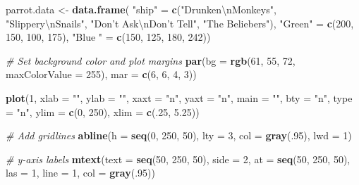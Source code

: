 \documentclass[]{book}
\newenvironment{Shaded}{\begin{snugshade}}{\end{snugshade}}
\newcommand{\KeywordTok}[1]{\textcolor[rgb]{0.13,0.29,0.53}{\textbf{#1}}}
\newcommand{\DataTypeTok}[1]{\textcolor[rgb]{0.13,0.29,0.53}{#1}}
\newcommand{\DecValTok}[1]{\textcolor[rgb]{0.00,0.00,0.81}{#1}}
\newcommand{\FloatTok}[1]{\textcolor[rgb]{0.00,0.00,0.81}{#1}}
\newcommand{\CharTok}[1]{\textcolor[rgb]{0.31,0.60,0.02}{#1}}
\newcommand{\StringTok}[1]{\textcolor[rgb]{0.31,0.60,0.02}{#1}}
\newcommand{\CommentTok}[1]{\textcolor[rgb]{0.56,0.35,0.01}{\textit{#1}}}
\newcommand{\NormalTok}[1]{#1}
\theoremstyle{definition}
\theoremstyle{definition}
\theoremstyle{remark}
\begin{document}
\begin{Shaded}
\begin{Highlighting}[]
\NormalTok{parrot.data <-}\StringTok{ }\KeywordTok{data.frame}\NormalTok{(}
  \StringTok{"ship"}\NormalTok{ =}\StringTok{ }\KeywordTok{c}\NormalTok{(}\StringTok{"Drunken}\CharTok{\textbackslash{}n}\StringTok{Monkeys"}\NormalTok{, }\StringTok{"Slippery}\CharTok{\textbackslash{}n}\StringTok{Snails"}\NormalTok{, }\StringTok{"Don't Ask}\CharTok{\textbackslash{}n}\StringTok{Don't Tell"}\NormalTok{, }\StringTok{"The Beliebers"}\NormalTok{),}
  \StringTok{"Green"}\NormalTok{ =}\StringTok{ }\KeywordTok{c}\NormalTok{(}\DecValTok{200}\NormalTok{, }\DecValTok{150}\NormalTok{, }\DecValTok{100}\NormalTok{, }\DecValTok{175}\NormalTok{),}
  \StringTok{"Blue "}\NormalTok{ =}\StringTok{ }\KeywordTok{c}\NormalTok{(}\DecValTok{150}\NormalTok{, }\DecValTok{125}\NormalTok{, }\DecValTok{180}\NormalTok{, }\DecValTok{242}\NormalTok{))}

\CommentTok{# Set background color and plot margins}
\KeywordTok{par}\NormalTok{(}\DataTypeTok{bg =} \KeywordTok{rgb}\NormalTok{(}\DecValTok{61}\NormalTok{, }\DecValTok{55}\NormalTok{, }\DecValTok{72}\NormalTok{, }\DataTypeTok{maxColorValue =} \DecValTok{255}\NormalTok{),}
    \DataTypeTok{mar =} \KeywordTok{c}\NormalTok{(}\DecValTok{6}\NormalTok{, }\DecValTok{6}\NormalTok{, }\DecValTok{4}\NormalTok{, }\DecValTok{3}\NormalTok{))}

\KeywordTok{plot}\NormalTok{(}\DecValTok{1}\NormalTok{, }\DataTypeTok{xlab =} \StringTok{""}\NormalTok{, }\DataTypeTok{ylab =} \StringTok{""}\NormalTok{, }\DataTypeTok{xaxt =} \StringTok{"n"}\NormalTok{,}
     \DataTypeTok{yaxt =} \StringTok{"n"}\NormalTok{, }\DataTypeTok{main =} \StringTok{""}\NormalTok{, }\DataTypeTok{bty =} \StringTok{"n"}\NormalTok{, }\DataTypeTok{type =} \StringTok{"n"}\NormalTok{,}
     \DataTypeTok{ylim =} \KeywordTok{c}\NormalTok{(}\DecValTok{0}\NormalTok{, }\DecValTok{250}\NormalTok{), }\DataTypeTok{xlim =} \KeywordTok{c}\NormalTok{(.}\DecValTok{25}\NormalTok{, }\FloatTok{5.25}\NormalTok{))}

\CommentTok{# Add gridlines}
\KeywordTok{abline}\NormalTok{(}\DataTypeTok{h =} \KeywordTok{seq}\NormalTok{(}\DecValTok{0}\NormalTok{, }\DecValTok{250}\NormalTok{, }\DecValTok{50}\NormalTok{), }
       \DataTypeTok{lty =} \DecValTok{3}\NormalTok{, }
       \DataTypeTok{col =} \KeywordTok{gray}\NormalTok{(.}\DecValTok{95}\NormalTok{), }\DataTypeTok{lwd =} \DecValTok{1}\NormalTok{)}

\CommentTok{# y-axis labels}
\KeywordTok{mtext}\NormalTok{(}\DataTypeTok{text =} \KeywordTok{seq}\NormalTok{(}\DecValTok{50}\NormalTok{, }\DecValTok{250}\NormalTok{, }\DecValTok{50}\NormalTok{),}
      \DataTypeTok{side =} \DecValTok{2}\NormalTok{, }\DataTypeTok{at =} \KeywordTok{seq}\NormalTok{(}\DecValTok{50}\NormalTok{, }\DecValTok{250}\NormalTok{, }\DecValTok{50}\NormalTok{),}
      \DataTypeTok{las =} \DecValTok{1}\NormalTok{, }\DataTypeTok{line =} \DecValTok{1}\NormalTok{, }\DataTypeTok{col =} \KeywordTok{gray}\NormalTok{(.}\DecValTok{95}\NormalTok{))}


\end{Highlighting}
\end{Shaded}
\end{document}

